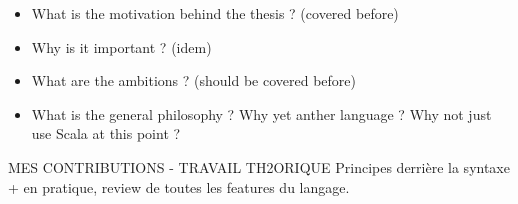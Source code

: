 
\begin{itemize}
    \item What is the motivation behind the thesis ? (covered before)
    \item Why is it important ? (idem)
    \item What are the ambitions ? (should be covered before)
    \item What is the general philosophy ?
    Why yet anther language ?
    Why not just use Scala at this point ?

\end{itemize}

MES CONTRIBUTIONS - TRAVAIL TH2ORIQUE
Principes derrière la syntaxe + en pratique, review de toutes les features du langage.